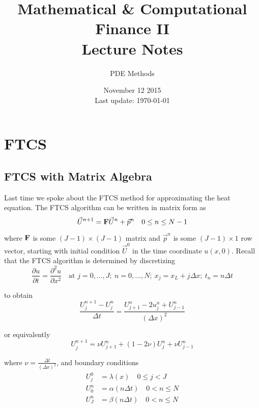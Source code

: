 \documentclass[12pt]{article}
\newlength\tindent
\renewcommand{\indent}{\hspace*{\tindent}}
\begin{document}
 
 
\title{Mathematical \& Computational Finance II\\Lecture Notes}
\author{PDE Methods}
\date{November 12 2015 \\ Last update: \today{}}
\maketitle

\section{FTCS}

\subsection{FTCS with Matrix Algebra}

\indent Last time we spoke about the FTCS method for approximating the heat equation. The FTCS algorithm can be written in matrix form as
\begin{equation*}
	\vec{U}^{n + 1} = {\bf F} \vec{U}^n + \vec{p}^n \quad 0 \leq n \leq N - 1
\end{equation*}

where ${\bf F}$ is some $(J - 1)\times(J - 1)$ matrix and $\vec{p}^n$ is some $(J - 1) \times 1$ row vector, starting with initial condition $\vec{U}^0$ in the time coordinate $u(x, 0)$. Recall that the FTCS algorithm is determined by discretizing 
\begin{equation*}
	\frac{ \partial u }{ \partial t } = \frac{ \partial^2 u }{ \partial x^2 } \quad \text{at } j = 0, ..., J;~n = 0, ..., N;~x_j = x_L + j\Delta x;~t_n = n\Delta t
\end{equation*}

to obtain
\begin{equation*}
	\frac{U^{n + 1}_j - U^n_j}{ \Delta t } = \frac{ U^n_{j + 1} - 2u^n_j + U^n_{j - 1} }{ (\Delta x)^2 }
\end{equation*}

or equivalently
\begin{equation*}
	U^{n + 1}_j = \nu U^n_{j + 1} + (1 - 2\nu)U^n_j + \nu U^n_{j - 1}
\end{equation*}

where $\nu = \frac{ \Delta t}{ (\Delta x)^2 }$, and boundary conditions
\begin{align*}
	U^0_j &= \lambda(x) \quad 0 \leq j < J \\
	U^n_0 &= \alpha(n\Delta t) \quad 0 < n \leq N \\
	U^n_J &= \beta(n\Delta t) \quad 0 < n \leq N
\end{align*}
\end{document}
